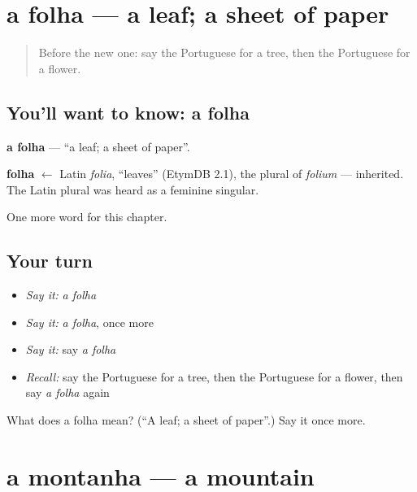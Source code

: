 \section[a folha]{a folha — a leaf; a sheet of paper}

\label{lesson:PT-C56-folha}



\begin{quote}
Before the new one: say the Portuguese for a tree, then the Portuguese for a flower.
\end{quote}

\subsection*{You'll want to know: a folha}
\textbf{a folha} — \textquotedblleft{}a leaf; a sheet of paper\textquotedblright{}.

\begin{cousinweb}
\textbf{folha} $\leftarrow$ Latin \emph{folia}, \textquotedblleft{}leaves\textquotedblright{} (EtymDB 2.1), the plural of \emph{folium} — inherited. The Latin plural was heard as a feminine singular.
\end{cousinweb}

\begin{grammarlens}[title={What you've built}]
One more word for this chapter.
\end{grammarlens}

\subsection*{Your turn}
\begin{itemize}
\raggedright
  \item \emph{Say it:} \emph{a folha}
  \item \emph{Say it:} \emph{a folha}, once more
  \item \emph{Say it:} say \emph{a folha}
  \item \emph{Recall:} say the Portuguese for a tree, then the Portuguese for a flower, then say \emph{a folha} again
\end{itemize}

\begin{tcolorbox}[breakable,colback=teal!4,colframe=teal!35!black,title={Before you move on}]
What does a folha mean? (\textquotedblleft{}A leaf; a sheet of paper\textquotedblright{}.) Say it once more.
\end{tcolorbox}
\section[a montanha]{a montanha — a mountain}

